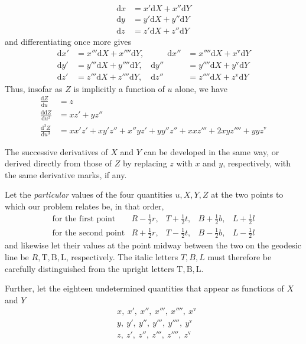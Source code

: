 %
\[
\begin{aligned}
\mathrm{d}x&=x'\mathrm{d}X+x''\mathrm{d}Y\\
\mathrm{d}y&=y'\mathrm{d}X+y''\mathrm{d}Y\\
\mathrm{d}z&=z'\mathrm{d}X+z''\mathrm{d}Y
\end{aligned}
\]
and differentiating once more gives
\[
\begin{aligned}
\mathrm{d}x'&=x'''\mathrm{d}X+x''''\mathrm{d}Y,&\qquad \mathrm{d}x''&=x''''\mathrm{d}X+x^{\mathrm{v}}\mathrm{d}Y\\
\mathrm{d}y'&=y'''\mathrm{d}X+y''''\mathrm{d}Y,&\mathrm{d}y''&=y''''\mathrm{d}X+y^{\mathrm{v}}\mathrm{d}Y\\
\mathrm{d}z'&=z'''\mathrm{d}X+z''''\mathrm{d}Y,&\mathrm{d}z''&=z''''\mathrm{d}X+z^{\mathrm{v}}\mathrm{d}Y
\end{aligned}
\]
Thus, insofar as \(Z\) is implicitly a function of \(u\) alone, we have
\[
\begin{aligned}
\frac{\mathrm{d}Z}{\mathrm{d}u}&=z\\
\frac{\mathrm{dd}Z}{\mathrm{d}u^2}&=xz'+yz''\\
\frac{\mathrm{d}^3Z}{\mathrm{d}u^3}&=xx'z'+xy'z''+x''yz'+yy''z''+xxz'''+2xyz''''+yyz^{\mathrm{v}}
\end{aligned}
\]

\indent The successive derivatives of \(X\) and \(Y\) can be developed in the same way, or derived directly from those of \(Z\) by replacing \(z\) with \(x\) and \(y\), respectively, with the same derivative marks, if any.

Let the \textit{particular} values of the four quantities \(u,X,Y,Z\) at the two points to which our problem relates be, in that order,
\[
\begin{array}{lllll}
\text{for the first point}&R-\tfrac12r,&T+\tfrac12t,&B+\tfrac12b,&L+\tfrac12l\\
\text{for the second point}&R+\tfrac12r,&T-\tfrac12t,&B-\tfrac12b,&L-\tfrac12l
\end{array}
\]
and likewise let their values at the point midway between the two on the geodesic line be \(R,\mathrm{T},\mathrm{B},\mathrm{L}\), respectively. The italic letters \(T,B,L\) must therefore be carefully distinguished from the upright letters \(\mathrm{T},\mathrm{B},\mathrm{L}\).

Further, let the eighteen undetermined quantities that appear as functions of \(X\) and \(Y\)
\[
\begin{aligned}
&x,\ x',\ x'',\ x''',\ x'''',\ x^{\mathrm{v}}\\
&y,\ y',\ y'',\ y''',\ y'''',\ y^{\mathrm{v}}\\
&z,\ z',\ z'',\ z''',\ z'''',\ z^{\mathrm{v}}
\end{aligned}
\]
